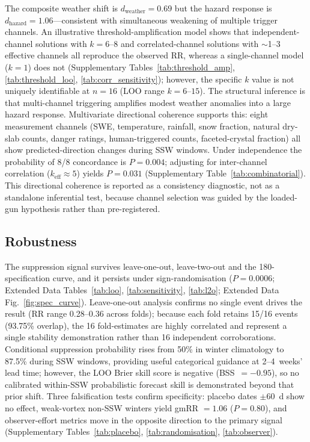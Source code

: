 \documentclass[11pt,letterpaper]{article}
\begin{document}
The composite weather shift is $d_{\mathrm{weather}} = 0.69$ but the hazard response is $d_{\mathrm{hazard}} = 1.06$---consistent with simultaneous weakening of multiple trigger channels. An illustrative threshold-amplification model shows that independent-channel solutions with $k = 6$--$8$ and correlated-channel solutions with $\sim$1--3 effective channels all reproduce the observed RR, whereas a single-channel model ($k = 1$) does not (Supplementary Tables~\ref{tab:threshold_amp}, \ref{tab:threshold_loo}, \ref{tab:corr_sensitivity}); however, the specific $k$ value is not uniquely identifiable at $n = 16$ (LOO range $k = 6$--$15$). The structural inference is that multi-channel triggering amplifies modest weather anomalies into a large hazard response. Multivariate directional coherence supports this: eight measurement channels (SWE, temperature, rainfall, snow fraction, natural dry-slab counts, danger ratings, human-triggered counts, faceted-crystal fraction) all show predicted-direction changes during SSW windows. Under independence the probability of 8/8 concordance is $P = 0.004$; adjusting for inter-channel correlation ($k_{\mathrm{eff}} \approx 5$) yields $P = 0.031$ (Supplementary Table~\ref{tab:combinatorial}). This directional coherence is reported as a consistency diagnostic, not as a standalone inferential test, because channel selection was guided by the loaded-gun hypothesis rather than pre-registered.

\subsection*{Robustness}

The suppression signal survives leave-one-out, leave-two-out and the 180-specification curve, and it persists under sign-randomisation ($P = 0.0006$; Extended Data Tables~\ref{tab:loo}, \ref{tab:sensitivity}, \ref{tab:l2o}; Extended Data Fig.~\ref{fig:spec_curve}). Leave-one-out analysis confirms no single event drives the result (RR range 0.28--0.36 across folds); because each fold retains 15/16 events (93.75\% overlap), the 16 fold-estimates are highly correlated and represent a single stability demonstration rather than 16 independent corroborations. Conditional suppression probability rises from 50\% in winter climatology to 87.5\% during SSW windows, providing useful categorical guidance at 2--4~weeks' lead time; however, the LOO Brier skill score is negative (BSS~$= -0.95$), so no calibrated within-SSW probabilistic forecast skill is demonstrated beyond that prior shift. Three falsification tests confirm specificity: placebo dates $\pm$60~d show no effect, weak-vortex non-SSW winters yield gmRR $= 1.06$ ($P = 0.80$), and observer-effort metrics move in the opposite direction to the primary signal (Supplementary Tables~\ref{tab:placebo}, \ref{tab:randomisation}, \ref{tab:observer}).
\end{document}
